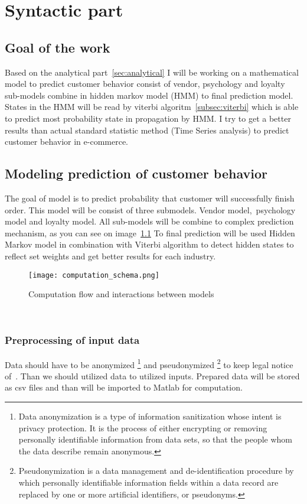
\chapter{Syntactic part}
\label{sec:methodology}
\section{Goal of the work} \label{sec:goal}
Based on the analytical part~\ref{sec:analytical} I will be working on a mathematical model to predict customer behavior consist of vendor,
psychology and loyalty sub-models combine in hidden markov model (HMM) to final prediction model.
States in the HMM will be read by viterbi algoritm~\ref{subsec:viterbi} which is able to predict most probability state in propagation by HMM.
I try to get a better results than actual standard statistic method (Time Series analysis) to predict customer behavior in e-commerce.
\section{Modeling prediction of customer behavior} \label{sec:modeling}
The goal of model is to predict probability that customer will successfully finish order. This model will be consist of three submodels.
Vendor model,\ psychology model and loyalty model. All sub-models will be combine to complex prediction mechanism, as you can see on image~\ref{Model schema with interaction}
To final prediction will be used Hidden Markov model in combination with Viterbi algorithm to detect hidden states to reflect set weights and get better results for each industry.
\\
\begin{figure}[h!]
    \begin{center}
        \texttt{[image: computation\_schema.png]}
    \end{center}
    \caption{Computation flow and interactions between models}
    \label{Model schema with interaction}
\end{figure}
\\
\subsection{Preprocessing of input data} \label{subsec:preprocessing}
Data should have to be anonymized \footnote{Data anonymization is a type of information sanitization whose intent
is privacy protection.
It is the process of either encrypting or removing personally identifiable information from data sets, so that
the people whom the data describe remain anonymous.} and pseudonymized \footnote{Pseudonymization is a data management
and de-identification procedure by which personally identifiable information fields within a data record are replaced
by one or more artificial identifiers, or pseudonyms.} to keep legal notice of~\cite{gdpr}.
Than we should utilized data to utilized inputs.
Prepared data will be stored as csv files and than will be imported to Matlab for computation.
\newpage
